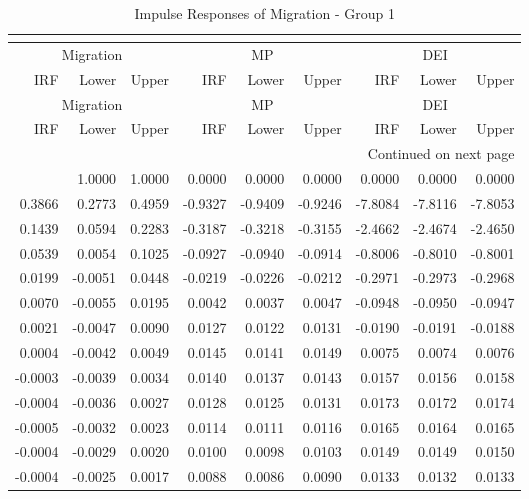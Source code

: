 \begin{longtable}{rrrrrrrrr}
\caption{Impulse Responses of Migration - Group 1}\\
\label{tab:mig_irf_group1}\\
\toprule
\multicolumn{3}{c}{Migration} & \multicolumn{3}{c}{MP} & \multicolumn{3}{c}{DEI} \\
IRF & Lower & Upper & IRF & Lower & Upper & IRF & Lower & Upper \\
\midrule
\endfirsthead
\toprule
\multicolumn{3}{c}{Migration} & \multicolumn{3}{c}{MP} & \multicolumn{3}{c}{DEI} \\
IRF & Lower & Upper & IRF & Lower & Upper & IRF & Lower & Upper \\
\midrule
\endhead
\midrule
\multicolumn{9}{r}{Continued on next page} \\
\midrule
\endfoot
\bottomrule
\endlastfoot
1.0000 & 1.0000 & 1.0000 & 0.0000 & 0.0000 & 0.0000 & 0.0000 & 0.0000 & 0.0000 \\
0.3866 & 0.2773 & 0.4959 & -0.9327 & -0.9409 & -0.9246 & -7.8084 & -7.8116 & -7.8053 \\
0.1439 & 0.0594 & 0.2283 & -0.3187 & -0.3218 & -0.3155 & -2.4662 & -2.4674 & -2.4650 \\
0.0539 & 0.0054 & 0.1025 & -0.0927 & -0.0940 & -0.0914 & -0.8006 & -0.8010 & -0.8001 \\
0.0199 & -0.0051 & 0.0448 & -0.0219 & -0.0226 & -0.0212 & -0.2971 & -0.2973 & -0.2968 \\
0.0070 & -0.0055 & 0.0195 & 0.0042 & 0.0037 & 0.0047 & -0.0948 & -0.0950 & -0.0947 \\
0.0021 & -0.0047 & 0.0090 & 0.0127 & 0.0122 & 0.0131 & -0.0190 & -0.0191 & -0.0188 \\
0.0004 & -0.0042 & 0.0049 & 0.0145 & 0.0141 & 0.0149 & 0.0075 & 0.0074 & 0.0076 \\
-0.0003 & -0.0039 & 0.0034 & 0.0140 & 0.0137 & 0.0143 & 0.0157 & 0.0156 & 0.0158 \\
-0.0004 & -0.0036 & 0.0027 & 0.0128 & 0.0125 & 0.0131 & 0.0173 & 0.0172 & 0.0174 \\
-0.0005 & -0.0032 & 0.0023 & 0.0114 & 0.0111 & 0.0116 & 0.0165 & 0.0164 & 0.0165 \\
-0.0004 & -0.0029 & 0.0020 & 0.0100 & 0.0098 & 0.0103 & 0.0149 & 0.0149 & 0.0150 \\
-0.0004 & -0.0025 & 0.0017 & 0.0088 & 0.0086 & 0.0090 & 0.0133 & 0.0132 & 0.0133 \\
\end{longtable}